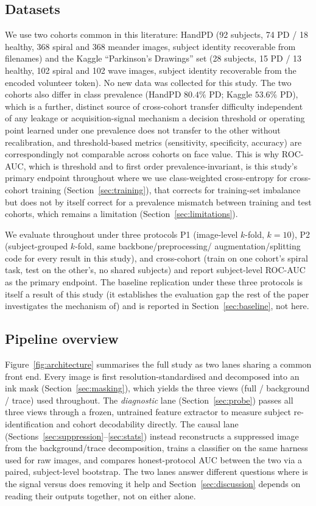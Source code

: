 \documentclass[3p,final,10pt]{elsarticle}
\let\oldsubsection\subsection
\renewcommand{\subsection}{\FloatBarrier\oldsubsection}
\begin{document}
\subsection{Datasets}
We use two cohorts common in this literature: HandPD \cite{pereira2015}
(92 subjects, 74 PD / 18 healthy, 368 spiral and 368 meander images,
subject identity recoverable from filenames) and the Kaggle
``Parkinson's Drawings'' set \cite{zham2017} (28 subjects, 15 PD / 13
healthy, 102 spiral and 102 wave images, subject identity recoverable from
the encoded volunteer token). No new data was collected for this study.
The two cohorts also differ in class prevalence (HandPD $80.4\%$ PD;
Kaggle $53.6\%$ PD), which is a further, distinct source of cross-cohort
transfer difficulty independent of any leakage or acquisition-signal
mechanism a decision threshold or operating point learned under one
prevalence does not transfer to the other without recalibration, and
threshold-based metrics (sensitivity, specificity, accuracy) are
correspondingly not comparable across cohorts on face value. This is why
ROC-AUC, which is threshold and to first order prevalence-invariant, is
this study's primary endpoint throughout where we use class-weighted
cross-entropy for cross-cohort training (Section~\ref{sec:training}), that
corrects for training-set imbalance but does not by itself correct for a
prevalence mismatch between training and test cohorts, which remains a
limitation (Section~\ref{sec:limitations}).

We evaluate throughout under three protocols P1 (image-level $k$-fold,
$k{=}10$), P2 (subject-grouped $k$-fold, same backbone/preprocessing/
augmentation/splitting code for every result in this study), and
cross-cohort (train on one cohort's spiral task, test on the other's, no
shared subjects) and report subject-level ROC-AUC as the primary
endpoint. The baseline replication under these three protocols is itself
a result of this study (it establishes the evaluation gap the rest of the
paper investigates the mechanism of) and is reported in
Section~\ref{sec:baseline}, not here.

\subsection{Pipeline overview}
Figure~\ref{fig:architecture} summarises the full study as two lanes sharing
a common front end. Every image is first resolution-standardised and
decomposed into an ink mask (Section~\ref{sec:masking}), which yields the
three views (full / background / trace) used throughout. The
\emph{diagnostic} lane (Section~\ref{sec:probe}) passes all three views
through a frozen, untrained feature extractor to measure subject
re-identification and cohort decodability directly. The causal lane
(Sections~\ref{sec:suppression}--\ref{sec:stats}) instead reconstructs a
suppressed image from the background/trace decomposition, trains a
classifier on the same harness used for raw images, and compares
honest-protocol AUC between the two via a paired, subject-level bootstrap.
The two lanes answer different questions where is the signal
versus does removing it help and Section~\ref{sec:discussion} depends on reading
their outputs together, not on either alone.
\end{document}
